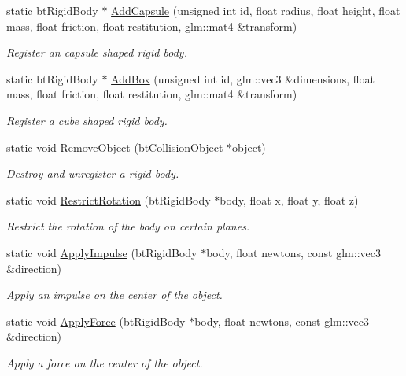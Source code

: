 \begin{DoxyCompactItemize}
static bt\+Rigid\+Body $\ast$ \hyperlink{classTarbora_1_1PhysicsEngine_af511b9509696fa6ffcaa2515f3a391aa}{Add\+Capsule} (unsigned int id, float radius, float height, float mass, float friction, float restitution, glm\+::mat4 \&transform)
\begin{DoxyCompactList}\small\item\em Register an capsule shaped rigid body. \end{DoxyCompactList}\item 
static bt\+Rigid\+Body $\ast$ \hyperlink{classTarbora_1_1PhysicsEngine_a4ec40e1a3ab05c7fe1e0216534484750}{Add\+Box} (unsigned int id, glm\+::vec3 \&dimensions, float mass, float friction, float restitution, glm\+::mat4 \&transform)
\begin{DoxyCompactList}\small\item\em Register a cube shaped rigid body. \end{DoxyCompactList}\item 
static void \hyperlink{classTarbora_1_1PhysicsEngine_a4debfab1c812e22ccd4f65b0b7e9cea7}{Remove\+Object} (bt\+Collision\+Object $\ast$object)
\begin{DoxyCompactList}\small\item\em Destroy and unregister a rigid body. \end{DoxyCompactList}\item 
static void \hyperlink{classTarbora_1_1PhysicsEngine_a57ee013c92f3721beb4efbc2405522dd}{Restrict\+Rotation} (bt\+Rigid\+Body $\ast$body, float x, float y, float z)
\begin{DoxyCompactList}\small\item\em Restrict the rotation of the body on certain planes. \end{DoxyCompactList}\item 
static void \hyperlink{classTarbora_1_1PhysicsEngine_a3d5343fcdd079664377637ff9188595e}{Apply\+Impulse} (bt\+Rigid\+Body $\ast$body, float newtons, const glm\+::vec3 \&direction)
\begin{DoxyCompactList}\small\item\em Apply an impulse on the center of the object. \end{DoxyCompactList}\item 
static void \hyperlink{classTarbora_1_1PhysicsEngine_a83b98f62953485af3b5e04d6bf4adba9}{Apply\+Force} (bt\+Rigid\+Body $\ast$body, float newtons, const glm\+::vec3 \&direction)
\begin{DoxyCompactList}\small\item\em Apply a force on the center of the object. \end{DoxyCompactList}\item 

\end{DoxyCompactItemize}
